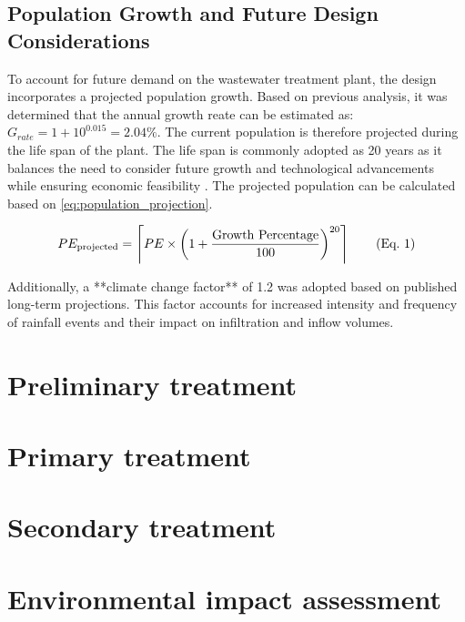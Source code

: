\documentclass[12pt]{article}
\begin{document}
\subsection*{Population Growth and Future Design Considerations}

To account for future demand on the wastewater treatment plant, the design incorporates a projected population 
growth. Based on previous analysis, it was determined that 
the annual growth reate can be estimated as: \(G_{rate} = 1 + 10^{0.015} =2.04\%\).
The current population is therefore projected during the life span of the plant. The life span is 
commonly adopted as 20 years as it balances the need to consider future growth and 
technological advancements while ensuring economic feasibility \cite{wef_DesignWaterResource}.
The projected population can be calculated based on \eqref{eq:population_projection}. 

\begin{align}
  \refstepcounter{equation}
  PE_{\text{projected}} = \left\lceil PE \times \left(1 + \frac{\text{Growth Percentage}}{100} \right)^{20} \right\rceil 
  \tag{Eq.~\theequation} \label{eq:population_projection}
\end{align}


  
  

\noindent Additionally, a **climate change factor** of 1.2 was adopted based on published long-term projections. This factor accounts for increased intensity and frequency of rainfall events and their impact on infiltration and inflow volumes.




\newpage

\section{Preliminary treatment}
\newpage

\section{Primary treatment}
\newpage

\section{Secondary treatment}
\newpage

\section{Environmental impact assessment}
\newpage
\end{document}
